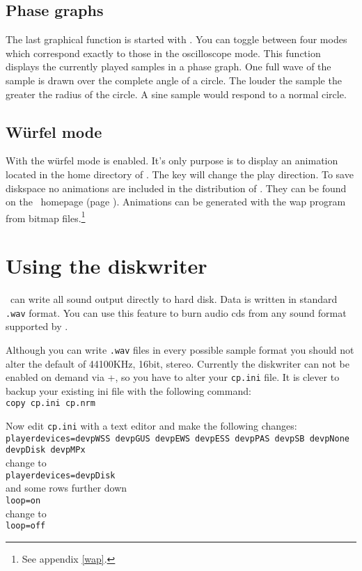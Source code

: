 \subsection{Phase graphs}
The last graphical function is started with . You can toggle
between four modes which correspond exactly to those in the
oscilloscope mode. This function displays the currently played samples
in a phase graph. One full wave of the sample is drawn over the
complete angle of a circle. The louder the sample the greater the
radius of the circle. A sine sample would respond to a normal circle.

\subsection{W\"urfel mode}
With  the w\"urfel mode is enabled. It's only purpose is to
display an animation located in the home directory of \cp. The
 key will change the play direction.  {\small To save
diskspace no animations are included in the distribution of \cp.  They
can be found on the \cp\ homepage (page \pageref{homepage}).}
Animations can be generated with the wap program from bitmap
files.\footnote{See appendix
\ref{wap}.}

\section{Using the diskwriter}
\label{diskwriter}
\cp\ can write all sound output directly to hard disk. Data is written in
standard \texttt{.wav} format. You can use this feature to burn audio
cds from any sound format supported by \cp.

Although you can write \texttt{.wav} files in every possible sample
format you should not alter the default of 44100KHz, 16bit,
stereo. Currently the diskwriter can not be enabled on demand via
+, so you have to alter your \texttt{cp.ini}
file. It is clever to backup your
existing ini file with the following command:\\
\texttt{copy cp.ini cp.nrm}

Now edit \texttt{cp.ini} with a text editor and make the following changes:\\
\texttt{playerdevices=devpWSS devpGUS devpEWS devpESS devpPAS devpSB devpNone devpDisk devpMPx}\\
change to \\
\texttt{playerdevices=devpDisk}\\
and some rows further down \\
\texttt{loop=on}\\
change to \\
\texttt{loop=off}

